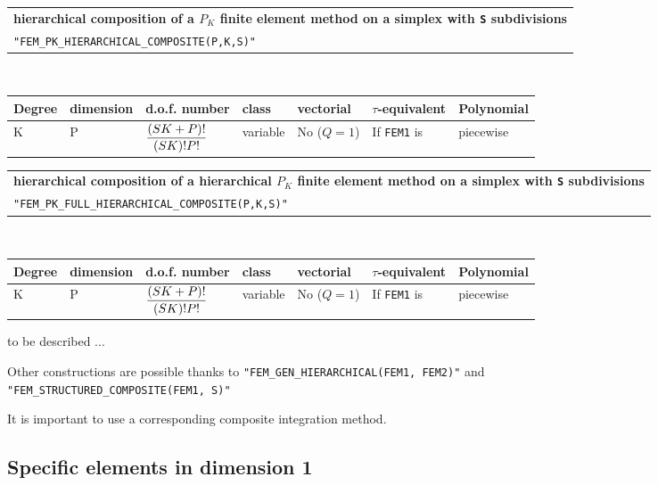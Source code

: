 \documentclass[11pt,a4paper]{article}
\begin{document}
\begin{center}
\begin{tabular}{|m{16.109cm}|} \hline 
{\bf hierarchical composition of a $P_K$ finite element method on a simplex with {\tt S} subdivisions}\\
{\tt "FEM\_PK\_HIERARCHICAL\_COMPOSITE(P,K,S)"} 
\end{tabular} \\ \vspace{-1pt} 
\begin{tabular}{|m{2cm}|m{2cm}|m{2.5cm}|m{1.5cm}|m{1.5cm}|m{2cm}|m{2cm}|} \hline 
Degree & dimension & d.o.f. number & class & vectorial & \mbox{$\tau$-equivalent} & Polynomial\\ \hline
\small K & \small P & \mbox{${\displaystyle \frac{\displaystyle (SK+P)!}{\displaystyle (SK)! P!}}$} & variable & No \mbox{($Q = 1$)} & If {\tt FEM1} is  & piecewise\\ \hline
\end{tabular}
\end{center}

\begin{center}
\begin{tabular}{|m{16.109cm}|} \hline 
{\bf hierarchical composition of a hierarchical $P_K$ finite element method on a simplex with {\tt S} subdivisions}\\
{\tt "FEM\_PK\_FULL\_HIERARCHICAL\_COMPOSITE(P,K,S)"} 
\end{tabular} \\ \vspace{-1pt} 
\begin{tabular}{|m{2cm}|m{2cm}|m{2.5cm}|m{1.5cm}|m{1.5cm}|m{2cm}|m{2cm}|} \hline 
Degree & dimension & d.o.f. number & class & vectorial & \mbox{$\tau$-equivalent} & Polynomial\\ \hline
\small K & \small P & \mbox{${\displaystyle \frac{\displaystyle (SK+P)!}{\displaystyle (SK)! P!}}$} & variable & No \mbox{($Q = 1$)} & If {\tt FEM1} is  & piecewise\\ \hline
\end{tabular}
\end{center}

to be described ...

Other constructions are possible thanks to {\tt "FEM\_GEN\_HIERARCHICAL(FEM1, FEM2)"} and \\ {\tt "FEM\_STRUCTURED\_COMPOSITE(FEM1, S)"}

It is important to use a corresponding composite integration method.

\subsection{Specific elements in dimension 1}
\end{document}
